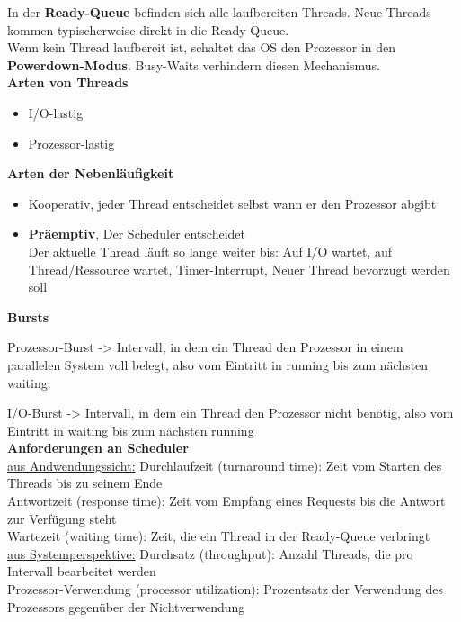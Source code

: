 \documentclass[8pt]{extarticle}
\let\oldtextbf\textbf
\renewcommand{\textbf}{\tiny\oldtextbf}
\begin{document}
\begin{multicols*}{5}
	In der \textbf{Ready-Queue} befinden sich alle laufbereiten Threads. Neue Threads kommen typischerweise direkt in die Ready-Queue.\\
	
	Wenn kein Thread laufbereit ist, schaltet das OS den Prozessor in den \textbf{Powerdown-Modus}. Busy-Waits verhindern diesen Mechanismus.\\
	
	\textbf{Arten von Threads}
	\begin{itemize} [noitemsep, topsep=0pt, leftmargin=*]
		\item I/O-lastig
		\item Prozessor-lastig
	\end{itemize}
	
	\vspace{5pt}
	
	\textbf{Arten der Nebenläufigkeit}
	\begin{itemize} [noitemsep, topsep=0pt, leftmargin=*]
		\item Kooperativ, jeder Thread entscheidet selbst wann er den Prozessor abgibt
		\item \textbf{Präemptiv}, Der Scheduler entscheidet\\Der aktuelle Thread läuft so lange weiter bis: Auf I/O wartet, auf Thread/Ressource wartet, Timer-Interrupt, Neuer Thread bevorzugt werden soll
	\end{itemize}
	
	\vspace{5pt}
	
	\textbf{Bursts}
	
	Prozessor-Burst -> Intervall, in dem ein Thread den Prozessor in einem parallelen System voll belegt, also vom Eintritt in running bis zum nächsten waiting.
	
	I/O-Burst -> Intervall, in dem ein Thread den Prozessor nicht benötig, also vom Eintritt in waiting bis zum nächsten running\\
	
	\textbf{Anforderungen an Scheduler}\\
	\underline{aus Andwendungssicht:}
	Durchlaufzeit (turnaround time): Zeit vom Starten des Threads bis zu seinem Ende\\
	Antwortzeit (response time): Zeit vom Empfang eines Requests bis die Antwort zur Verfügung steht\\
	Wartezeit (waiting time): Zeit, die ein Thread in der Ready-Queue verbringt\\
	\underline{aus Systemperspektive:}
	Durchsatz (throughput): Anzahl Threads, die pro Intervall bearbeitet werden\\
	Prozessor-Verwendung (processor utilization): Prozentsatz der Verwendung des Prozessors gegenüber der Nichtverwendung\\
	

\end{multicols*}
\end{document}
